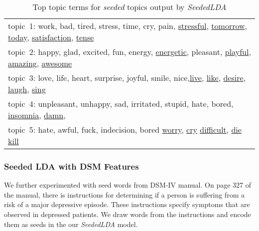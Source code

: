 \begin{table*} [ht!]
	\begin{tabular}{ l }
	\hline
{topic~1: work, bad, tired, stress, time, cry, pain, \underline{stressful}, \underline{tomorrow}, \underline{today}, \underline{satisfaction}, \underline{tense}}\\
{topic~2: happy, glad, excited, fun, energy, \underline{energetic}, pleasant, \underline{playful}, \underline{amazing}, \underline{awesome}}\\
{topic~3: love, life, heart, surprise, joyful, smile, nice,\underline{live}, \underline{like}, \underline{desire}, \underline{laugh}, \underline{sing}}\\
{topic~4: unpleasant, unhappy, sad, irritated, stupid, hate, bored, \underline {insomnia}, \underline{damn}, }\\
{topic~5: hate, awful, fuck, indecision, bored \underline{worry}, \underline{cry} \underline{difficult}, \underline{die} \underline{kill}}\\
\hline
    \end{tabular}
      \caption{\noindent Top topic terms for \textit{seeded} topics output by \textit{SeededLDA}}
        \label{table:seedwords_2}
\end{table*}

\subsubsection{Seeded LDA with DSM Features}

We further experimented with seed words from DSM-IV manual\cite{dsm4}. On page 327 of the manual, there is instructions for determining if a person is suffering from a risk of a major depressive episode. These instructions specify symptoms that are observed in depressed patients. We draw words from the instructions and encode them as seeds in the our \textit{SeededLDA} model.

